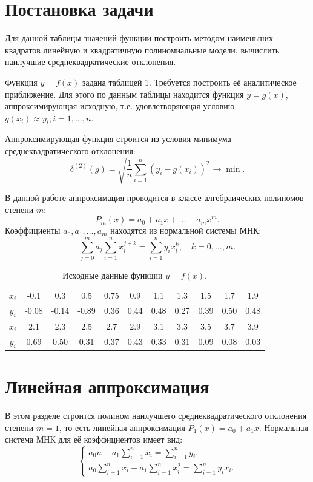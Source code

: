
\section{Постановка задачи}
Для данной таблицы значений функции построить методом наименьших квадратов линейную и квадратичную полиномиальные модели, вычислить наилучшие среднеквадратические отклонения.

Функция $y = f(x)$ задана таблицей 1. Требуется построить её аналитическое приближение. Для этого по данным таблицы находится функция $y = g(x)$, аппроксимирующая исходную, т.е. удовлетворяющая условию $g(x_i) \approx y_i, i = 1,\dots,n$.

Аппроксимирующая функция строится из условия минимума среднеквадратического отклонения:
\[
\delta^{(2)}(g) = \sqrt{\frac{1}{n} \sum_{i=1}^{n} (y_i - g(x_i))^2} \to \min.
\]

В данной работе аппроксимация проводится в классе алгебраических полиномов степени $m$:
\[
P_m(x) = a_0 + a_1 x + \dots + a_m x^m.
\]
Коэффициенты $a_0, a_1, \dots, a_m$ находятся из нормальной системы МНК:
\[
\sum_{j=0}^{m} a_j \sum_{i=1}^{n} x_i^{j+k} = \sum_{i=1}^{n} y_i x_i^k, \quad k = 0,\dots,m.
\]

\begin{table}[h]
\centering
\begin{tabular}{|c|cccccccccc|}
\hline
$x_i$ & -0.1 & 0.3 & 0.5 & 0.75 & 0.9 & 1.1 & 1.3 & 1.5 & 1.7 & 1.9 \\
$y_i$ & -0.08 & -0.14 & -0.89 & 0.36 & 0.44 & 0.48 & 0.27 & 0.39 & 0.50 & 0.48 \\
\hline
$x_i$ & 2.1 & 2.3 & 2.5 & 2.7 & 2.9 & 3.1 & 3.3 & 3.5 & 3.7 & 3.9 \\
$y_i$ & 0.69 & 0.50 & 0.31 & 0.37 & 0.43 & 0.33 & 0.31 & 0.09 & 0.08 & 0.03 \\
\hline
\end{tabular}
\caption{Исходные данные функции $y = f(x)$.}
\end{table}

\section{Линейная аппроксимация}
В этом разделе строится полином наилучшего среднеквадратического отклонения степени $m = 1$, то есть линейная аппроксимация $P_1(x) = a_0 + a_1x$.
Нормальная система МНК для её коэффициентов имеет вид:
\[
\left\{
\begin{array}{l}
a_0 n + a_1 \sum_{i=1}^{n} x_i = \sum_{i=1}^{n} y_i, \\
a_0 \sum_{i=1}^{n} x_i + a_1 \sum_{i=1}^{n} x_i^2 = \sum_{i=1}^{n} y_i x_i.
\end{array}
\right.
\]

